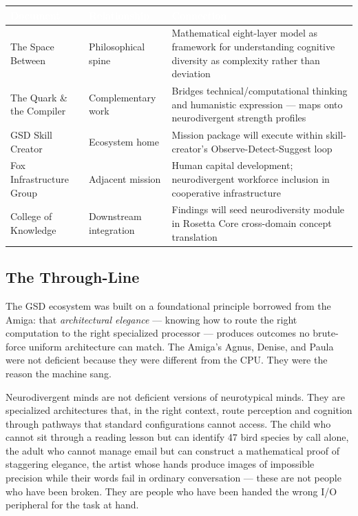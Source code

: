 \documentclass[11pt,letterpaper]{article}
\newcommand{\tableheader}[1]{\textbf{\sffamily\textcolor{white}{#1}}}
\begin{document}
\begin{center}
\begin{tabularx}{\textwidth}{L{3.5cm}L{3.5cm}X}
\toprule
{}
\tableheader{Document} & \tableheader{Relationship} & \tableheader{Connection} \\
\midrule
The Space Between & Philosophical spine & Mathematical eight-layer model as framework for understanding cognitive diversity as complexity rather than deviation \\
The Quark \& the Compiler & Complementary work & Bridges technical/computational thinking and humanistic expression — maps onto neurodivergent strength profiles \\
GSD Skill Creator & Ecosystem home & Mission package will execute within skill-creator's Observe-Detect-Suggest loop \\
Fox Infrastructure Group & Adjacent mission & Human capital development; neurodivergent workforce inclusion in cooperative infrastructure \\
College of Knowledge & Downstream integration & Findings will seed neurodiversity module in Rosetta Core cross-domain concept translation \\
\bottomrule
\end{tabularx}
\end{center}

\subsection{The Through-Line}

The GSD ecosystem was built on a foundational principle borrowed from the Amiga: that \textit{architectural elegance} — knowing how to route the right computation to the right specialized processor — produces outcomes no brute-force uniform architecture can match. The Amiga's Agnus, Denise, and Paula were not deficient because they were different from the CPU. They were the reason the machine sang.

Neurodivergent minds are not deficient versions of neurotypical minds. They are specialized architectures that, in the right context, route perception and cognition through pathways that standard configurations cannot access. The child who cannot sit through a reading lesson but can identify 47 bird species by call alone, the adult who cannot manage email but can construct a mathematical proof of staggering elegance, the artist whose hands produce images of impossible precision while their words fail in ordinary conversation — these are not people who have been broken. They are people who have been handed the wrong I/O peripheral for the task at hand.
\end{document}
